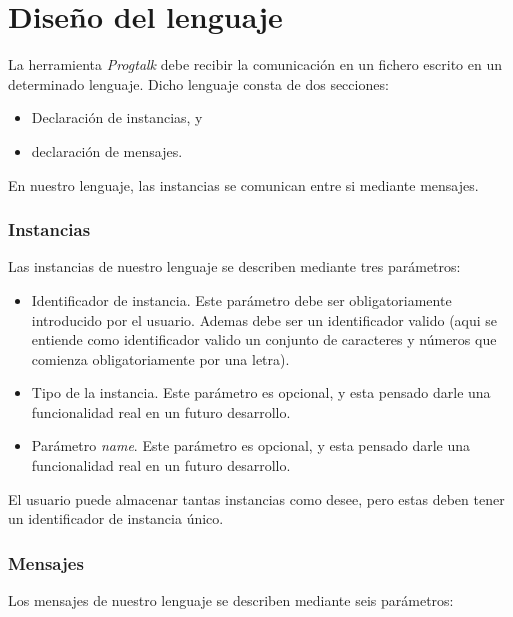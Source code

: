 \documentclass{article}
\begin{document}
\section{Diseño del lenguaje}

La herramienta \textit{Progtalk} debe recibir la comunicación en un fichero escrito en un determinado lenguaje. Dicho lenguaje consta de dos secciones:
\begin{itemize}
\item Declaración de instancias, y
\item declaración de mensajes.
\end{itemize}

En nuestro lenguaje, las instancias se comunican entre si mediante mensajes.

\subsubsection{Instancias}

Las instancias de nuestro lenguaje se describen mediante tres parámetros:

\begin{itemize}
\item Identificador de instancia. Este parámetro debe ser obligatoriamente introducido por el usuario. Ademas debe ser un identificador valido (aqui se entiende como identificador valido un conjunto de caracteres y números que comienza obligatoriamente por una letra).
\item Tipo de la instancia. Este parámetro es opcional, y esta pensado darle una funcionalidad real en un futuro desarrollo.
\item Parámetro \textit{name}. Este parámetro es opcional, y esta pensado darle una funcionalidad real en un futuro desarrollo.
\end{itemize}

El usuario puede almacenar tantas instancias como desee, pero estas deben tener un identificador de instancia único.

\subsubsection{Mensajes}

Los mensajes de nuestro lenguaje se describen mediante seis parámetros:
\end{document}
